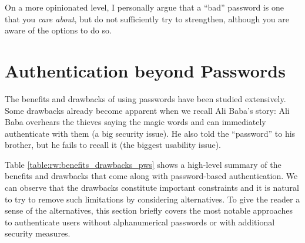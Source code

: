 On a more opinionated level, I personally argue that a ``bad'' password is one that you \textit{care about}, but do not sufficiently try to strengthen, although you are aware of the options to do so. 

\section{Authentication beyond Passwords}\label{sec:rw:authentication_without_pws}
The benefits and drawbacks of using passwords have been studied extensively. Some drawbacks already become apparent when we recall Ali Baba's story: Ali Baba overhears the thieves saying the magic words and can immediately authenticate with them (a big security issue). He also told the ``password'' to his brother, but he fails to recall it (the biggest usability issue).

Table \ref{table:rw:benefits_drawbacks_pws} shows a high-level summary of the benefits and drawbacks that come along with password-based authentication. We can observe that the drawbacks constitute important constraints and it is natural to try to remove such limitations by considering alternatives. To give the reader a sense of the alternatives, this section briefly covers the most notable approaches to authenticate users without alphanumerical passwords or with additional security measures. 

